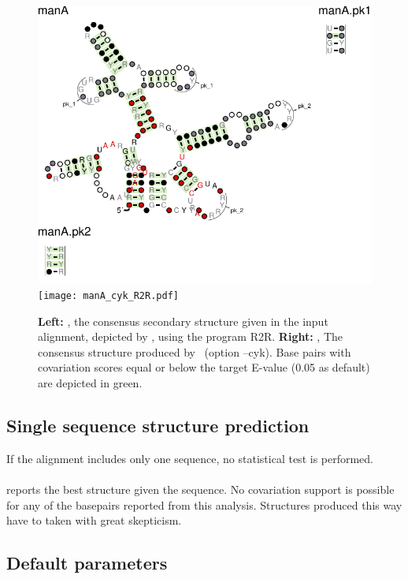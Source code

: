 \begin{figure}[h]
   \includegraphics[scale=0.7]{manA_R2R.pdf} 
  \texttt{[image: manA\_cyk\_R2R.pdf]} 
  \caption{\small\textbf{Left:}
    , the consensus
    secondary structure given in the input alignment, depicted by
    \rscape, using the program R2R.  \textbf{Right:}
    , The consensus
    structure produced by \rscape\ (option --cyk).  Base pairs with
    covariation scores equal or below the target E-value (0.05 as
    default) are depicted in green.  }
 \label{fig:manA_r2r}
 \end{figure}
 

 \subsection{Single sequence structure prediction}

 If the alignment includes only one sequence, no statistical test is performed. \\

 \noindent
 \\
%
 reports the best structure given the sequence. No covariation support
 is possible for any of the basepairs reported from this
 analysis. Structures produced this way have to taken with great
 skepticism. 

 \subsection{Default parameters}

